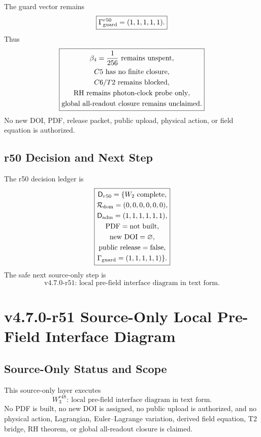 The guard vector remains
\[
\boxed{
\Gamma_{\rm guard}^{r50}=(1,1,1,1,1).
}
\]
Thus
\[
\boxed{
\begin{gathered}
\beta_4={1\over256}\text{ remains unspent},\\
C5\text{ has no finite closure},\\
C6/T2\text{ remains blocked},\\
\mathrm{RH}\text{ remains photon-clock probe only},\\
\text{global all-readout closure remains unclaimed}.
\end{gathered}
}
\]
No new DOI, PDF, release packet, public upload, physical action, or field
equation is authorized.

\subsection{r50 Decision and Next Step}
\label{subsec:r50-decision-next-step}

The r50 decision ledger is
\[
\boxed{
\begin{gathered}
\mathsf D_{r50}
=
\{
W_2\text{ complete},\\
\mathcal R_{\rm dom}=(0,0,0,0,0,0),\\
\mathsf D_{\rm adm}=(1,1,1,1,1,1),\\
\mathrm{PDF}=\mathrm{not\ built},\\
\mathrm{new\ DOI}=\varnothing,\\
\mathrm{public\ release}=\mathrm{false},\\
\Gamma_{\rm guard}=(1,1,1,1,1)
\}.
\end{gathered}
}
\]
The safe next source-only step is
\[
\boxed{
\text{v4.7.0-r51: local pre-field interface diagram in text form.}
}
\]


\section{v4.7.0-r51 Source-Only Local Pre-Field Interface Diagram}
\label{sec:r51-prefield-interface-diagram}

\subsection{Source-Only Status and Scope}
\label{subsec:r51-source-only-status}

This source-only layer executes
\[
\boxed{W_3^{r48}:\ \text{local pre-field interface diagram in text form}.}
\]
No PDF is built, no new DOI is assigned, no public upload is authorized, and no
physical action, Lagrangian, Euler--Lagrange variation, derived field equation,
T2 bridge, RH theorem, or global all-readout closure is claimed.

